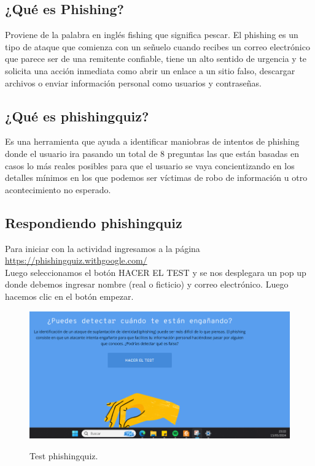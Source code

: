 \documentclass[stu, 11pt, letterpaper, donotrepeattitle, floatsintext, natbib]{apa7}
\begin{document}
\subsection{¿Qué es Phishing?} 
Proviene de la palabra en inglés fishing que significa pescar. El phishing es un tipo de ataque que comienza con un señuelo cuando recibes un correo electrónico que parece ser de una remitente confiable, tiene un alto sentido de urgencia y te solicita una acción inmediata como abrir un enlace a un sitio falso, descargar archivos o enviar información personal como usuarios y contraseñas. 
\noindent \citep{phishing}\\

\subsection{¿Qué es phishingquiz?} 

Es una herramienta que ayuda a identificar maniobras de intentos de phishing donde el usuario ira pasando un total de 8 preguntas las que están basadas en casos lo más reales posibles para que el usuario se vaya concientizando en los detalles mínimos en los que podemos ser víctimas de robo de información u otro acontecimiento no esperado.

\subsection{Respondiendo phishingquiz} 

Para iniciar con la actividad ingresamos a la página \url{https://phishingquiz.withgoogle.com/}  \noindent \citep{phishingQuiz}\\  Luego seleccionamos el botón HACER EL TEST y se nos desplegara un pop up donde debemos ingresar nombre (real o ficticio) y correo electrónico. Luego hacemos clic en el botón empezar.

\begin{figure}[H]
    \centering
    \caption{Test phishingquiz.}
    \includegraphics[width=0.75\linewidth]{phishing1.png} %
    \label{fig:OverallEffect}
\end{figure}
\end{document}
